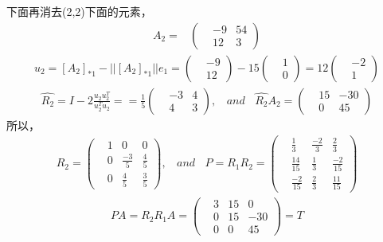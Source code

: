 \documentclass[UTF8,12pt, a4paper]{ctexart}
\begin{document}
  下面再消去(2,2)下面的元素，
  \begin{align*}
    A_2 = &
    \left(
      \begin{matrix}
        &-9  &54  \\
        &12  &3 
      \end{matrix}
    \right) 
  \end{align*}
  \begin{align*}
    u_2=[A_2]_{*1}-||[A_2]_{*1}||e_1=
    \left(
      \begin{matrix}
        &-9 \\
        &12 
      \end{matrix}
    \right)- 15
    \left(
      \begin{matrix}
        &1 \\
        &0 
      \end{matrix}
    \right) =12
    \left(
      \begin{matrix}
        &-2 \\
        &1 
      \end{matrix}
    \right)
  \end{align*}
  \begin{align*}
    \hat{R_2}=I-2\frac{u_2 u_2^T}{u_2^Tu_2}=
    =\frac{1}{5}
    \left(
      \begin{matrix}
        &-3 &4 \\
        &4 &3
      \end{matrix}
    \right),
    \ \ \ \ and \ \ \ \ 
    \hat{R_2}A_2=
    \left(
      \begin{matrix}
        &15 &-30 \\
        &0 &45
      \end{matrix}
    \right)
  \end{align*}
  所以，
  \begin{align*}
    R_2 =
    \left(
      \begin{matrix}
        &1 &0  &0  \\
        &0 &\frac{-3}{5}  &\frac{4}{5}  \\
        &0 &\frac{4}{5}  &\frac{3}{5} 
      \end{matrix}
    \right),
    \ \ \ \  and \ \ \ \ 
    P=R_1R_2=
    \left(
      \begin{matrix}
        &\frac{1}{3} &\frac{-2}{3}  &\frac{2}{3}  \\
        &\frac{14}{15} &\frac{1}{3}  &\frac{-2}{15} \\
        &\frac{-2}{15} &\frac{2}{3} &\frac{11}{15}
      \end{matrix}
    \right)
  \end{align*}
  \begin{align*}
    PA=R_2 R_1 A=
    \left(
      \begin{matrix}
        &3 &15  &0  \\
        &0 &15 &-30 \\
        &0 &0 &45
      \end{matrix}
    \right) = T
  \end{align*}
\end{document}
